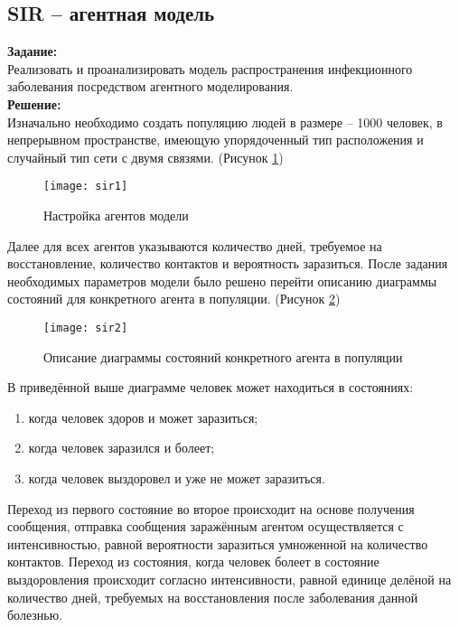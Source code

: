 \subsection*{SIR -- агентная модель}

\textbf{Задание:}\\
Реализовать и проанализировать модель распространения инфекционного заболевания посредством агентного моделирования.\\

\textbf{Решение:}\\
Изначально необходимо создать популяцию людей в размере -- 1000 человек, в непрерывном пространстве, имеющую упорядоченный тип расположения и случайный тип сети с двумя связями. (Рисунок \ref{fig:sir1})
\begin{figure}[h]
	\centering \texttt{[image: sir1]}
	\caption{Настройка агентов модели}
	\label{fig:sir1}
\end{figure}

Далее для всех агентов указываются количество дней, требуемое на восстановление, количество контактов и вероятность заразиться. После задания необходимых параметров модели было решено перейти описанию диаграммы состояний для конкретного агента в популяции. (Рисунок \ref{fig:sir2})
\begin{figure}[h]
	\centering \texttt{[image: sir2]}
	\caption{Описание диаграммы состояний конкретного агента в популяции}
	\label{fig:sir2}
\end{figure}

\newpage

В приведённой выше диаграмме человек может находиться в состояниях:
\begin{enumerate}[topsep=0pt,itemsep=-1ex,partopsep=1ex,parsep=1ex]
	\item когда человек здоров и может заразиться;
	\item когда человек заразился и болеет;
	\item когда человек выздоровел и уже не может заразиться.\\
\end{enumerate}

Переход из первого состояние во второе происходит на основе получения сообщения, отправка сообщения заражённым агентом осуществляется с интенсивностью, равной вероятности заразиться умноженной на количество контактов. Переход из состояния, когда человек болеет в состояние выздоровления происходит согласно интенсивности, равной единице делёной на количество дней, требуемых на восстановления после заболевания данной болезнью.\\


